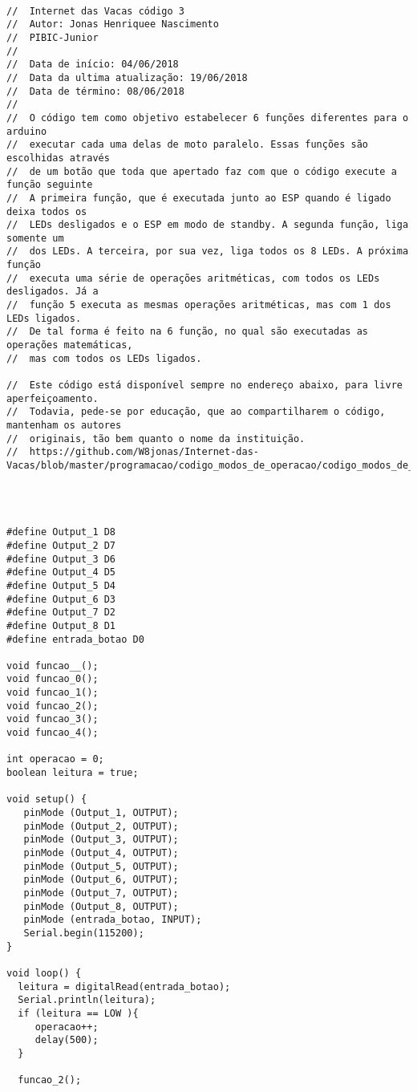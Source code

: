 {
\begin{lstlisting}

//  Internet das Vacas código 3
//  Autor: Jonas Henriquee Nascimento
//  PIBIC-Junior
//
//  Data de início: 04/06/2018
//  Data da ultima atualização: 19/06/2018
//  Data de término: 08/06/2018
//  
//  O código tem como objetivo estabelecer 6 funções diferentes para o arduino
//  executar cada uma delas de moto paralelo. Essas funções são escolhidas através 
//  de um botão que toda que apertado faz com que o código execute a função seguinte
//  A primeira função, que é executada junto ao ESP quando é ligado deixa todos os
//  LEDs desligados e o ESP em modo de standby. A segunda função, liga somente um
//  dos LEDs. A terceira, por sua vez, liga todos os 8 LEDs. A próxima função 
//  executa uma série de operações aritméticas, com todos os LEDs desligados. Já a 
//  função 5 executa as mesmas operações aritméticas, mas com 1 dos LEDs ligados. 
//  De tal forma é feito na 6 função, no qual são executadas as operações matemáticas,
//  mas com todos os LEDs ligados.

//  Este código está disponível sempre no endereço abaixo, para livre aperfeiçoamento. 
//  Todavia, pede-se por educação, que ao compartilharem o código, mantenham os autores
//  originais, tão bem quanto o nome da instituição.
//  https://github.com/W8jonas/Internet-das-Vacas/blob/master/programacao/codigo_modos_de_operacao/codigo_modos_de_operacao.ino




#define Output_1 D8
#define Output_2 D7
#define Output_3 D6
#define Output_4 D5
#define Output_5 D4
#define Output_6 D3
#define Output_7 D2
#define Output_8 D1
#define entrada_botao D0

void funcao__();
void funcao_0();
void funcao_1();
void funcao_2();
void funcao_3();
void funcao_4();

int operacao = 0;
boolean leitura = true;

void setup() {
   pinMode (Output_1, OUTPUT);
   pinMode (Output_2, OUTPUT);
   pinMode (Output_3, OUTPUT);
   pinMode (Output_4, OUTPUT);
   pinMode (Output_5, OUTPUT);
   pinMode (Output_6, OUTPUT);
   pinMode (Output_7, OUTPUT);
   pinMode (Output_8, OUTPUT);
   pinMode (entrada_botao, INPUT);
   Serial.begin(115200);
}

void loop() {
  leitura = digitalRead(entrada_botao);
  Serial.println(leitura);
  if (leitura == LOW ){
     operacao++;
     delay(500);
  }

  funcao_2(); 


\end{lstlisting}}
